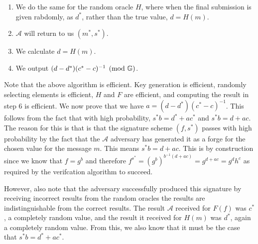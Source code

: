 \documentclass{article}
\begin{document}
\begin{mdbmarginx}{1ex}{0pt}{1ex}{0pt}
\begin{enumerate}[noitemsep,topsep=\mdcompacttopsep]
\item{}We do the same for the random oracle $H$, where when the final submission is given rabdomly, as
$d^*$, rather than the true value, $d = H(m)$.%

\item{}$\mathcal{A}$ will return to us $(m^*,s^*)$.%

\item{}We calculate $d = H(m)$.%

\item{}We output $(d-d^*)(c^* - c)^{-1} \pmod{\mathbb{G}}$.%
\end{enumerate}%

\noindent{}Note that the above algorithm is efficient. Key generation is efficient, randomly selecting elements
is efficient, $H$ and $F$ are efficient, and computing the result in step 6 is efficient. We now 
prove that we have $a = (d-d^*)(c^* - c)^{-1}$. This follows from the fact that
with high probability, $s^*b = d^* + ac^*$ and $s^*b = d + ac$. The reason for this is that 
is that the signature scheme $(f,s^*)$ passes with high probability by the fact that 
the $\mathcal{A}$ adversary has generated it as a forge for the chosen value for the message
$m$. This means $s^*b = d + ac$. This is by construction since we know that $f = g^b$ and
therefore $f^{s^*} = (g^b)^{b^{-1}(d + ac)} = g^{d+ac} = g^dh^c$ as required by the verifcation algorithm
to succeed.%

However, also note that the adversary successfully produced this signature by receiving incorrect
results from the random oracles \textendash{} the results are indistinguishable from the correct results. The result 
$\mathcal{A}$ received for $F(f)$ was $c^*$, a completely random value, and the result it received for 
$H(m)$ was $d^*$, again a completely random value. From this, we also know that it must be the 
case that $s^*b = d^* + ac^*$.%


\end{mdbmarginx}
\end{document}
